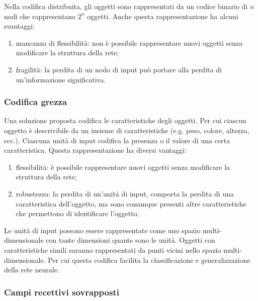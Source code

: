Nella codifica distribuita, gli oggetti sono rappresentati da un codice binario
di $n$ nodi che rappresentano $2^n$ oggetti. Anche questa rappresentazione ha
alcuni svantaggi:
\begin{enumerate}
	\item mancanza di flessibilità: non è possibile rappresentare nuovi oggetti
	      senza modificare la struttura della rete;

	\item fragilità: la perdita di un nodo di input può portare alla perdita
	      di un'informazione significativa.
\end{enumerate}

\subsubsection{Codifica grezza}

Una soluzione proposta codifica le caratteristiche degli oggetti. Per cui
ciascun oggetto è descrivibile da un insieme di caratteristiche (e.g. peso,
colore, altezza, ecc.). Ciascuna unità di input codifica la presenza o il valore
di una certa caratteristica. Questa rappresentazione ha diversi vantaggi:

\begin{enumerate}
	\item flessibilità: è possibile rappresentare nuovi oggetti senza modificare
	      la struttura della rete;

	\item robustezza: la perdita di un'unità di input, comporta la perdita di
	      una caratteristica dell'oggetto, ma sono comunque presenti altre
	      caratteristiche che permettono di identificare l'oggetto.
\end{enumerate}

Le unità di input possono essere rappresentate come uno spazio
multi-dimensionale con tante dimensioni quante sono le unità. Oggetti con
caratteristiche simili saranno rappresentati da punti vicini nello spazio
multi-dimensionale. Per cui questa codifica facilita la classificazione e
generalizzazione della rete neurale.

\subsubsection{Campi recettivi sovrapposti}


